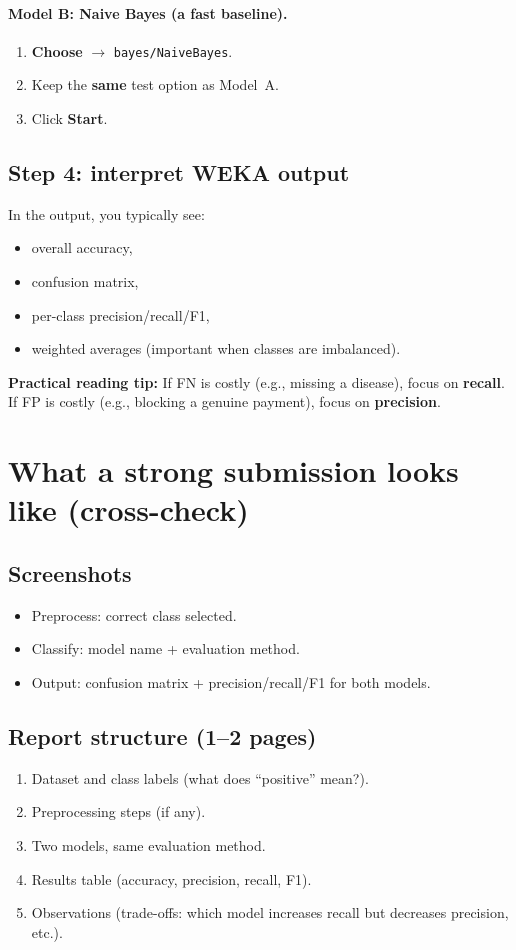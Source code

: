 \documentclass[11pt]{article}
\begin{document}
\paragraph{Model B: Naive Bayes (a fast baseline).}
\begin{enumerate}[leftmargin=*]
  \item \textbf{Choose} $\rightarrow$ \texttt{bayes/NaiveBayes}.
  \item Keep the \textbf{same} test option as Model~A.
  \item Click \textbf{Start}.
\end{enumerate}

\subsection{Step 4: interpret WEKA output}
In the output, you typically see:
\begin{itemize}[leftmargin=*]
  \item overall accuracy,
  \item confusion matrix,
  \item per-class precision/recall/F1,
  \item weighted averages (important when classes are imbalanced).
\end{itemize}
\textbf{Practical reading tip:} If FN is costly (e.g., missing a disease), focus on \textbf{recall}. If FP is costly (e.g., blocking a genuine payment), focus on \textbf{precision}.

\section{What a strong submission looks like (cross-check)}
\subsection{Screenshots}
\begin{itemize}[leftmargin=*]
  \item Preprocess: correct class selected.
  \item Classify: model name + evaluation method.
  \item Output: confusion matrix + precision/recall/F1 for both models.
\end{itemize}

\subsection{Report structure (1--2 pages)}
\begin{enumerate}[leftmargin=*]
  \item Dataset and class labels (what does ``positive'' mean?).
  \item Preprocessing steps (if any).
  \item Two models, same evaluation method.
  \item Results table (accuracy, precision, recall, F1).
  \item Observations (trade-offs: which model increases recall but decreases precision, etc.).
\end{enumerate}
\end{document}
